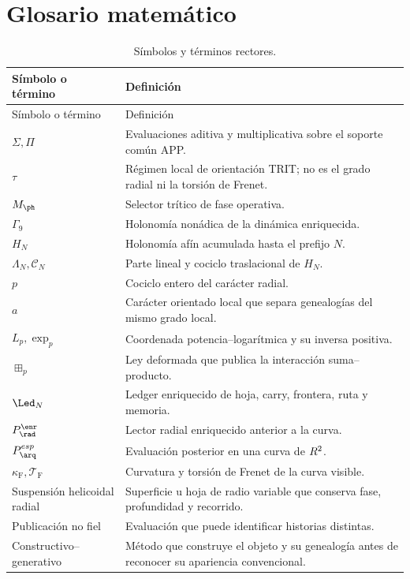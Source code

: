\chapter{Glosario matemático}

\begin{longtable}{p{}p{}}
\caption{Símbolos y términos rectores.}
\label{espiral:tab:glosario}\\
\toprule
Símbolo o término&Definición\\
\midrule
\endfirsthead
\toprule
Símbolo o término&Definición\\
\midrule
\endhead
\(\Sigma,\Pi\)&Evaluaciones aditiva y multiplicativa sobre el soporte
común APP.\\
\(\tau\)&Régimen local de orientación TRIT; no es el grado radial ni la
torsión de Frenet.\\
\(M_{\ph}\)&Selector trítico de fase operativa.\\
\(\Gamma_9\)&Holonomía nonádica de la dinámica enriquecida.\\
\(H_N\)&Holonomía afín acumulada hasta el prefijo \(N\).\\
\(\Lambda_N,\mathcal C_N\)&Parte lineal y cociclo traslacional de \(H_N\).\\
\(p\)&Cociclo entero del carácter radial.\\
\(a\)&Carácter orientado local que separa genealogías del mismo
grado local.\\
\(L_p,\exp_p\)&Coordenada potencia--logarítmica y su inversa positiva.\\
\(\boxplus_p\)&Ley deformada que publica la interacción suma--producto.\\
\(\Led_N\)&Ledger enriquecido de hoja, carry, frontera, ruta y memoria.\\
\(\mathcal P_{\rad}^{\enr}\)&Lector radial enriquecido anterior a la curva.\\
\(\mathcal P_{\arq}^{\mathrm{esp}}\)&Evaluación posterior en una curva de
\(R^2\).\\
\(\kappa_{\mathrm{F}},\mathcal T_{\mathrm{F}}\)&Curvatura y torsión de Frenet de la
curva visible.\\
Suspensión helicoidal radial&Superficie u hoja de radio variable que
conserva fase, profundidad y recorrido.\\
Publicación no fiel&Evaluación que puede identificar historias distintas.\\
Constructivo--generativo&Método que construye el objeto y su genealogía
antes de reconocer su apariencia convencional.\\
\bottomrule
\end{longtable}
